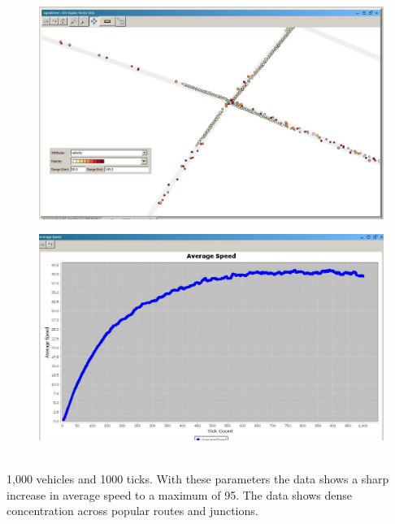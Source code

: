 \documentclass[11pt]{article}
\begin{document}
\begin{enumerate}
\begin{figure}[h!]
\begin{center}
\includegraphics[scale=0.2]{nyc_small_traffic_light_10_000_veh_1000_ticks_SCREENSHOT}
\caption{}
\end{center}
\end{figure}

\begin{figure}[h!]
\begin{center}
\includegraphics[scale=0.2]{nyc_small_traffic_light_10_000_veh_1000_ticks_AVG_speed}
\caption{}
\end{center}
\end{figure}

\\
1,000 vehicles and 1000 ticks. With these parameters the data shows a sharp increase in average speed to a maximum of 95. The data shows dense concentration across popular routes and junctions.


\end{enumerate}
\end{document}
